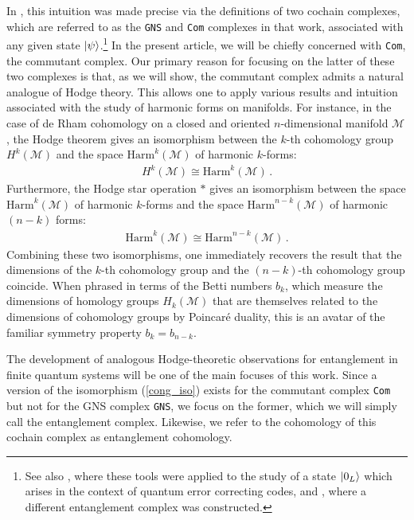 \documentclass[12pt]{article}
\numberwithin{equation}{section}
\begin{document}
In \cite{Mainiero:2019enr}, this intuition was made precise via the definitions of two cochain complexes, which are referred to as the \texttt{GNS} and \texttt{Com} complexes in that work, associated with any given state $\ket{\psi}$.\footnote{See also \cite{Harvey:2020jvu}, where these tools were applied to the study of a state $\ket{0_L}$ which arises in the context of quantum error correcting codes, and \cite{Hamilton:2023klg}, where a different entanglement complex was constructed.} In the present article, we will be chiefly concerned with \texttt{Com}, the commutant complex. Our primary reason for focusing on the latter of these two complexes is that, as we will show, the commutant complex admits a natural analogue of Hodge theory. This allows one to apply various results and intuition associated with the study of harmonic forms on manifolds. For instance, in the case of de Rham cohomology on a closed and oriented $n$-dimensional manifold $\mathcal{M}$, the Hodge theorem gives an isomorphism between the $k$-th cohomology group $H^k ( \mathcal{M} )$ and the space $\mathrm{Harm}^k ( \mathcal{M} )$ of harmonic $k$-forms:
%
\begin{align}
    H^k ( \mathcal{M} ) \cong \mathrm{Harm}^k ( \mathcal{M} ) \, .
\end{align}
%
Furthermore, the Hodge star operation $\ast$ gives an isomorphism between the space $\mathrm{Harm}^k ( \mathcal{M} )$ of harmonic $k$-forms and the space $\mathrm{Harm}^{n-k} ( \mathcal{M} )$ of harmonic $(n-k)$ forms:
%
\begin{align}\label{cong_iso}
    \mathrm{Harm}^k ( \mathcal{M} ) \cong \mathrm{Harm}^{n-k} ( \mathcal{M} ) \, .
\end{align}
%
Combining these two isomorphisms, one immediately recovers the result that the dimensions of the $k$-th cohomology group and the $(n-k)$-th cohomology group coincide. When phrased in terms of the Betti numbers $b_k$, which measure the dimensions of homology groups $H_k ( \mathcal{M} )$ that are themselves related to the dimensions of cohomology groups by Poincar\'e duality, this is an avatar of the familiar symmetry property $b_k = b_{n-k}$. 


The development of analogous Hodge-theoretic observations for entanglement in finite quantum systems will be one of the main focuses of this work. Since a version of the isomorphism (\ref{cong_iso}) exists for the commutant complex \texttt{Com} but not for the GNS complex \texttt{GNS}, we focus on the former, which we will simply call the entanglement complex. Likewise, we refer to the cohomology of this cochain complex as entanglement cohomology.
\end{document}
